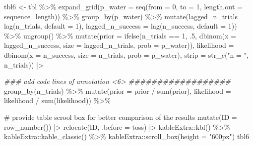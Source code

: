 \documentclass[
  letterpaper,
  DIV=11,
  numbers=noendperiod]{scrreprt}
\newenvironment{Shaded}{\begin{snugshade}}{\end{snugshade}}
\newcommand{\AttributeTok}[1]{\textcolor[rgb]{0.40,0.45,0.13}{#1}}
\newcommand{\CommentTok}[1]{\textcolor[rgb]{0.37,0.37,0.37}{#1}}
\newcommand{\DecValTok}[1]{\textcolor[rgb]{0.68,0.00,0.00}{#1}}
\newcommand{\DocumentationTok}[1]{\textcolor[rgb]{0.37,0.37,0.37}{\textit{#1}}}
\newcommand{\FunctionTok}[1]{\textcolor[rgb]{0.28,0.35,0.67}{#1}}
\newcommand{\InformationTok}[1]{\textcolor[rgb]{0.37,0.37,0.37}{#1}}
\newcommand{\NormalTok}[1]{\textcolor[rgb]{0.00,0.23,0.31}{#1}}
\newcommand{\OtherTok}[1]{\textcolor[rgb]{0.00,0.23,0.31}{#1}}
\newcommand{\SpecialCharTok}[1]{\textcolor[rgb]{0.37,0.37,0.37}{#1}}
\newcommand{\StringTok}[1]{\textcolor[rgb]{0.13,0.47,0.30}{#1}}
\begin{document}
\begin{Shaded}
\begin{Highlighting}[]
\NormalTok{tbl6 }\OtherTok{\textless{}{-}}\NormalTok{ tbl }\SpecialCharTok{\%\textgreater{}\%} 
  \FunctionTok{expand\_grid}\NormalTok{(}\AttributeTok{p\_water =} \FunctionTok{seq}\NormalTok{(}\AttributeTok{from =} \DecValTok{0}\NormalTok{, }\AttributeTok{to =} \DecValTok{1}\NormalTok{, }
                            \AttributeTok{length.out =}\NormalTok{ sequence\_length)) }\SpecialCharTok{\%\textgreater{}\%} 
  \FunctionTok{group\_by}\NormalTok{(p\_water) }\SpecialCharTok{\%\textgreater{}\%} 
  \FunctionTok{mutate}\NormalTok{(}\AttributeTok{lagged\_n\_trials  =} \FunctionTok{lag}\NormalTok{(n\_trials, }\AttributeTok{default =} \DecValTok{1}\NormalTok{),}
         \AttributeTok{lagged\_n\_success =} \FunctionTok{lag}\NormalTok{(n\_success, }\AttributeTok{default =} \DecValTok{1}\NormalTok{)) }\SpecialCharTok{\%\textgreater{}\%} 
  \FunctionTok{ungroup}\NormalTok{() }\SpecialCharTok{\%\textgreater{}\%} 
  \FunctionTok{mutate}\NormalTok{(}\AttributeTok{prior      =} \FunctionTok{ifelse}\NormalTok{(n\_trials }\SpecialCharTok{==} \DecValTok{1}\NormalTok{, .}\DecValTok{5}\NormalTok{,}
                             \FunctionTok{dbinom}\NormalTok{(}\AttributeTok{x    =}\NormalTok{ lagged\_n\_success, }
                                    \AttributeTok{size =}\NormalTok{ lagged\_n\_trials, }
                                    \AttributeTok{prob =}\NormalTok{ p\_water)),}
         \AttributeTok{likelihood =} \FunctionTok{dbinom}\NormalTok{(}\AttributeTok{x    =}\NormalTok{ n\_success, }
                             \AttributeTok{size =}\NormalTok{ n\_trials, }
                             \AttributeTok{prob =}\NormalTok{ p\_water),}
         \AttributeTok{strip      =} \FunctionTok{str\_c}\NormalTok{(}\StringTok{"n = "}\NormalTok{, n\_trials)) }\SpecialCharTok{|\textgreater{}} 
    
  \DocumentationTok{\#\#\# add code lines of annotation \textless{}6\textgreater{} \#\#\#\#\#\#\#\#\#\#\#\#\#\#\#\#\#\# }
  \FunctionTok{group\_by}\NormalTok{(n\_trials) }\SpecialCharTok{\%\textgreater{}\%} 
  \FunctionTok{mutate}\NormalTok{(}\AttributeTok{prior      =}\NormalTok{ prior }\SpecialCharTok{/} \FunctionTok{sum}\NormalTok{(prior),}
         \AttributeTok{likelihood =}\NormalTok{ likelihood }\SpecialCharTok{/} \FunctionTok{sum}\NormalTok{(likelihood)) }\SpecialCharTok{\%\textgreater{}\%} 
    
  \CommentTok{\# provide table scrool box for better comparison of the results}
  \FunctionTok{mutate}\NormalTok{(}\AttributeTok{ID =} \FunctionTok{row\_number}\NormalTok{()) }\SpecialCharTok{|\textgreater{}} 
  \FunctionTok{relocate}\NormalTok{(ID, }\AttributeTok{.before =}\NormalTok{ toss) }\SpecialCharTok{|\textgreater{}} 
\NormalTok{  kableExtra}\SpecialCharTok{::}\FunctionTok{kbl}\NormalTok{() }\SpecialCharTok{\%\textgreater{}\%}
\NormalTok{  kableExtra}\SpecialCharTok{::}\FunctionTok{kable\_classic}\NormalTok{() }\SpecialCharTok{\%\textgreater{}\%}
\NormalTok{  kableExtra}\SpecialCharTok{::}\FunctionTok{scroll\_box}\NormalTok{(}\AttributeTok{height =} \StringTok{"600px"}\NormalTok{)}
\NormalTok{tbl6}
\InformationTok{\textasciigrave{}\textasciigrave{}\textasciigrave{}}
\end{Highlighting}
\end{Shaded}
\end{document}
